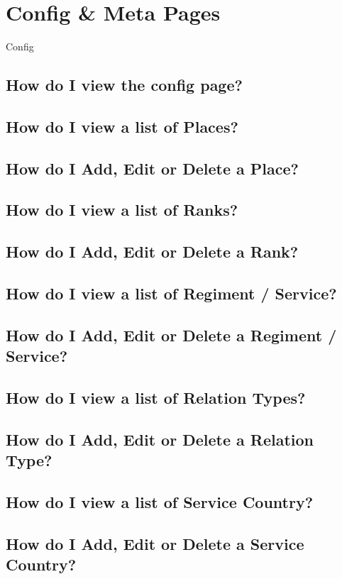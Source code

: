 \documentclass[12pt]{article}
\begin{document}
\newpage
\FloatBarrier
\section{Config \& Meta Pages}\label{sec:config}
Config
\subsection{How do I view the config page?}\label{ssec:config}
\subsection{How do I view a list of Places?}
\subsection{How do I Add, Edit or Delete a Place?}
\subsection{How do I view a list of Ranks?}
\subsection{How do I Add, Edit or Delete a Rank?}
\subsection{How do I view a list of Regiment / Service?}
\subsection{How do I Add, Edit or Delete a Regiment / Service?}
\subsection{How do I view a list of Relation Types?}
\subsection{How do I Add, Edit or Delete a Relation Type?}
\subsection{How do I view a list of Service Country?}
\subsection{How do I Add, Edit or Delete a Service Country?}
\end{document}
